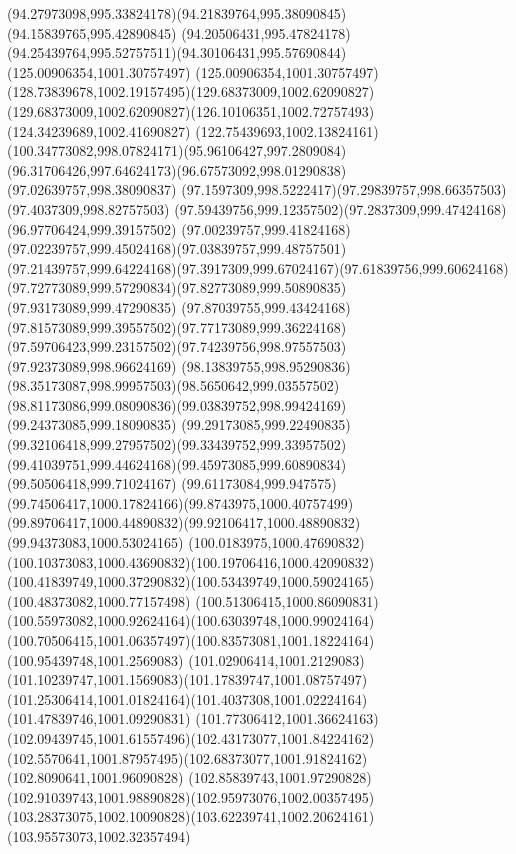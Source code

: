 {{		\curveto(94.27973098,995.33824178)(94.21839764,995.38090845)(94.15839765,995.42890845)
		\curveto(94.20506431,995.47824178)(94.25439764,995.52757511)(94.30106431,995.57690844)
		\lineto(125.00906354,1001.30757497)
		\curveto(125.00906354,1001.30757497)(128.73839678,1002.19157495)(129.68373009,1002.62090827)
		\curveto(129.68373009,1002.62090827)(126.10106351,1002.72757493)(124.34239689,1002.41690827)
		\curveto(122.75439693,1002.13824161)(100.34773082,998.07824171)(95.96106427,997.2809084)
		\curveto(96.31706426,997.64624173)(96.67573092,998.01290838)(97.02639757,998.38090837)
		\curveto(97.1597309,998.5222417)(97.29839757,998.66357503)(97.4037309,998.82757503)
		\curveto(97.59439756,999.12357502)(97.2837309,999.47424168)(96.97706424,999.39157502)
		\curveto(97.00239757,999.41824168)(97.02239757,999.45024168)(97.03839757,999.48757501)
		\curveto(97.21439757,999.64224168)(97.3917309,999.67024167)(97.61839756,999.60624168)
		\curveto(97.72773089,999.57290834)(97.82773089,999.50890835)(97.93173089,999.47290835)
		\curveto(97.87039755,999.43424168)(97.81573089,999.39557502)(97.77173089,999.36224168)
		\curveto(97.59706423,999.23157502)(97.74239756,998.97557503)(97.92373089,998.96624169)
		\curveto(98.13839755,998.95290836)(98.35173087,998.99957503)(98.5650642,999.03557502)
		\curveto(98.81173086,999.08090836)(99.03839752,998.99424169)(99.24373085,999.18090835)
		\curveto(99.29173085,999.22490835)(99.32106418,999.27957502)(99.33439752,999.33957502)
		\curveto(99.41039751,999.44624168)(99.45973085,999.60890834)(99.50506418,999.71024167)
		\curveto(99.61173084,999.947575)(99.74506417,1000.17824166)(99.8743975,1000.40757499)
		\curveto(99.89706417,1000.44890832)(99.92106417,1000.48890832)(99.94373083,1000.53024165)
		\curveto(100.0183975,1000.47690832)(100.10373083,1000.43690832)(100.19706416,1000.42090832)
		\curveto(100.41839749,1000.37290832)(100.53439749,1000.59024165)(100.48373082,1000.77157498)
		\curveto(100.51306415,1000.86090831)(100.55973082,1000.92624164)(100.63039748,1000.99024164)
		\curveto(100.70506415,1001.06357497)(100.83573081,1001.18224164)(100.95439748,1001.2569083)
		\curveto(101.02906414,1001.2129083)(101.10239747,1001.1569083)(101.17839747,1001.08757497)
		\curveto(101.25306414,1001.01824164)(101.4037308,1001.02224164)(101.47839746,1001.09290831)
		\curveto(101.77306412,1001.36624163)(102.09439745,1001.61557496)(102.43173077,1001.84224162)
		\curveto(102.5570641,1001.87957495)(102.68373077,1001.91824162)(102.8090641,1001.96090828)
		\curveto(102.85839743,1001.97290828)(102.91039743,1001.98890828)(102.95973076,1002.00357495)
		\curveto(103.28373075,1002.10090828)(103.62239741,1002.20624161)(103.95573073,1002.32357494)
}}
